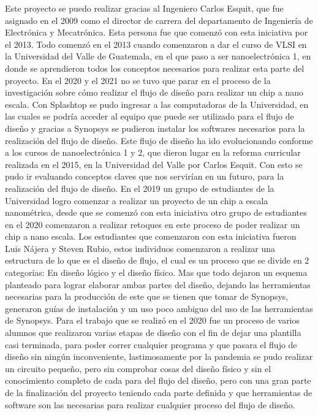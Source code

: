 
Este proyecto se puedo realizar gracias al Ingeniero Carlos Esquit, que fue asignado en el 2009 como el director de carrera del departamento de Ingeniería de Electrónica y Mecatrónica. Esta persona fue que comenzó con esta iniciativa por el 2013.
Todo comenzó en el 2013 cuando comenzaron a dar el curso de VLSI en la Universidad del Valle de Guatemala, en el que paso a ser nanoelectrónica 1, en donde se aprendieron todos los conceptos necesarios para realizar esta parte del proyecto. 
En el 2020 y el 2021 no se tuvo que parar en el proceso de la investigación sobre cómo realizar el flujo de diseño para realizar un chip a nano escala. Con Splashtop se pudo ingresar a las computadoras de la Universidad, en las cuales se podría acceder al equipo que puede ser utilizado para el flujo de diseño y gracias a Synopsys se pudieron instalar los softwares necesarios para la realización del flujo de diseño.
Este flujo de diseño ha ido evolucionando conforme a los cursos de nanoelectrónica 1 y 2, que dieron lugar en la reforma curricular realizada en el 2015, en la Universidad del Valle por Carlos Esquit. Con esto se pudo ir evaluando conceptos claves que nos servirían en un futuro, para la realización del flujo de diseño.
En el 2019 un grupo de estudiantes de la Universidad logro comenzar a realizar un proyecto de un chip a escala nanométrica, desde que se comenzó con esta iniciativa otro grupo de estudiantes en el 2020 comenzaron a realizar retoques en este proceso de poder realizar un chip a nano escala.
Los estudiantes que comenzaron con esta iniciativa fueron Luis Nájera y Steven Rubio, estos individuos comenzaron a realizar una estructura de lo que es el diseño de flujo, el cual es un proceso que se divide en 2 categorías: En diseño lógico y el diseño físico. Mas que todo dejaron un esquema planteado para lograr elaborar ambas partes del diseño, dejando las herramientas necesarias para la producción de este que se tienen que tomar de Synopsys, generaron guías de instalación y un uso poco ambiguo del uso de las herramientas de Synopsys.
Para el trabajo que se realizó en el 2020 fue un proceso de varios alumnos que realizaron varias etapas de diseño con el fin de dejar una plantilla casi terminada, para poder correr cualquier programa y que pasara el flujo de diseño sin ningún inconveniente, lastimosamente  por la pandemia  se pudo realizar  un circuito pequeño, pero sin comprobar cosas del diseño físico y sin el conocimiento completo de cada para del flujo del diseño, pero con una gran parte de la finalización del proyecto teniendo cada parte definida y que herramientas de software son las necesarias para realizar cualquier proceso del flujo de diseño.





\cite{hoover2010bio} \cite{park2014design}